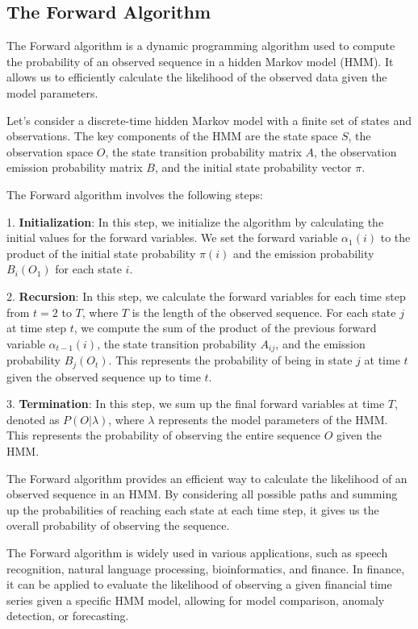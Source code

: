 \documentclass[a4paper,11pt]{article}
\begin{document}
\subsection{The Forward Algorithm}
\label{sec:forward}

The Forward algorithm is a dynamic programming algorithm used to compute the probability of an observed sequence in a hidden Markov model (HMM). It allows us to efficiently calculate the likelihood of the observed data given the model parameters.

Let's consider a discrete-time hidden Markov model with a finite set of states and observations. The key components of the HMM are the state space $S$, the observation space $O$, the state transition probability matrix $A$, the observation emission probability matrix $B$, and the initial state probability vector $\pi$.

The Forward algorithm involves the following steps:

1. \textbf{Initialization}: In this step, we initialize the algorithm by calculating the initial values for the forward variables. We set the forward variable $\alpha_1(i)$ to the product of the initial state probability $\pi(i)$ and the emission probability $B_{i}(O_1)$ for each state $i$.

2. \textbf{Recursion}: In this step, we calculate the forward variables for each time step from $t = 2$ to $T$, where $T$ is the length of the observed sequence. For each state $j$ at time step $t$, we compute the sum of the product of the previous forward variable $\alpha_{t-1}(i)$, the state transition probability $A_{ij}$, and the emission probability $B_{j}(O_t)$. This represents the probability of being in state $j$ at time $t$ given the observed sequence up to time $t$.

3. \textbf{Termination}: In this step, we sum up the final forward variables at time $T$, denoted as $P(O|\lambda)$, where $\lambda$ represents the model parameters of the HMM. This represents the probability of observing the entire sequence $O$ given the HMM.

The Forward algorithm provides an efficient way to calculate the likelihood of an observed sequence in an HMM. By considering all possible paths and summing up the probabilities of reaching each state at each time step, it gives us the overall probability of observing the sequence.

The Forward algorithm is widely used in various applications, such as speech recognition, natural language processing, bioinformatics, and finance. In finance, it can be applied to evaluate the likelihood of observing a given financial time series given a specific HMM model, allowing for model comparison, anomaly detection, or forecasting.
\end{document}
